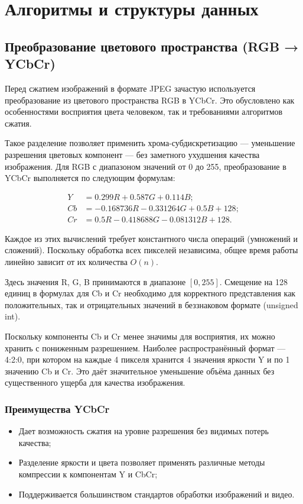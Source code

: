 \section{Алгоритмы и структуры данных}
\subsection{Преобразование цветового пространства (RGB → YCbCr)}

Перед сжатием изображений в формате JPEG зачастую используется преобразование из цветового пространства RGB в YCbCr. 
Это обусловлено как особенностями восприятия цвета человеком, так и требованиями алгоритмов сжатия.


Такое разделение позволяет применить хрома-субдискретизацию — уменьшение разрешения цветовых компонент — без заметного ухудшения качества изображения.
Для RGB с диапазоном значений от 0 до 255, преобразование в YCbCr выполняется по следующим формулам:


\begin{equation}
    \begin{aligned}
        Y &= 0.299R + 0.587G + 0.114B; \\
        Cb &= -0.168736R - 0.331264G + 0.5B + 128; \\
        Cr &= 0.5R - 0.418688G - 0.081312B + 128.
    \end{aligned}
\end{equation}

Каждое из этих вычислений требует константного числа операций (умножений и сложений).
Поскольку обработка всех пикселей независима, общее время работы линейно зависит от их количества $O(n)$.

Здесь значения R, G, B принимаются в диапазоне $[0, 255]$. 
Смещение на 128 единиц в формулах для Cb и Cr необходимо для корректного представления как положительных, так и отрицательных значений в беззнаковом формате (unsigned int).

Поскольку компоненты Cb и Cr менее значимы для восприятия, их можно хранить с пониженным разрешением. 
Наиболее распространённый формат — 4:2:0, при котором на каждые 4 пикселя хранится 4 значения яркости Y и по 1 значению Cb и Cr. 
Это даёт значительное уменьшение объёма данных без существенного ущерба для качества изображения.



\subsubsection{Преимущества YCbCr}
    \begin{itemize}
        \item Дает возможность сжатия на уровне разрешения без видимых потерь качества;
        \item Разделение яркости и цвета позволяет применять различные методы компрессии к компонентам Y и CbCr;
        \item Поддерживается большинством стандартов обработки изображений и видео.
    \end{itemize}

